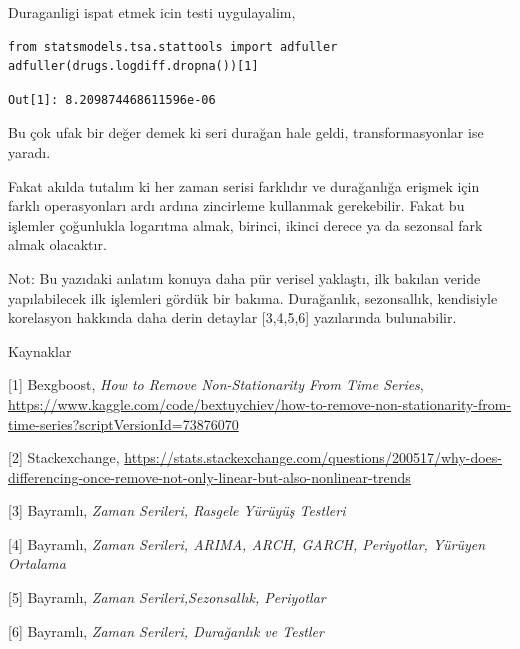 \documentclass[12pt,fleqn]{article}\usepackage{../../common}
\begin{document}
Duraganligi ispat etmek icin testi uygulayalim,

\begin{verbatim}
from statsmodels.tsa.stattools import adfuller
adfuller(drugs.logdiff.dropna())[1]
\end{verbatim}

\begin{verbatim}
Out[1]: 8.209874468611596e-06
\end{verbatim}

Bu çok ufak bir değer demek ki seri durağan hale geldi, transformasyonlar
ise yaradı.

Fakat akılda tutalım ki her zaman serisi farklıdır ve durağanlığa erişmek için
farklı operasyonları ardı ardına zincirleme kullanmak gerekebilir.  Fakat bu
işlemler çoğunlukla logarıtma almak, birinci, ikinci derece ya da sezonsal fark
almak olacaktır.

Not: Bu yazıdaki anlatım konuya daha pür verisel yaklaştı, ilk bakılan veride
yapılabilecek ilk işlemleri gördük bir bakıma. Durağanlık, sezonsallık,
kendisiyle korelasyon hakkında daha derin detaylar [3,4,5,6] yazılarında
bulunabilir.

Kaynaklar

[1] Bexgboost, {\em How to Remove Non-Stationarity From Time Series},
    \url{https://www.kaggle.com/code/bextuychiev/how-to-remove-non-stationarity-from-time-series?scriptVersionId=73876070}

[2] Stackexchange,
    \url{https://stats.stackexchange.com/questions/200517/why-does-differencing-once-remove-not-only-linear-but-also-nonlinear-trends}

[3] Bayramlı, {\em Zaman Serileri, Rasgele Yürüyüş Testleri}

[4] Bayramlı, {\em Zaman Serileri, ARIMA, ARCH, GARCH, Periyotlar, Yürüyen Ortalama}

[5] Bayramlı, {\em Zaman Serileri,Sezonsallık, Periyotlar}

[6] Bayramlı, {\em Zaman Serileri, Durağanlık ve Testler}
\end{document}
